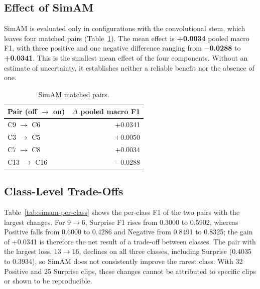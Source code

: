 \subsection{Effect of SimAM}
\label{sec:simam-effect-result}
\label{sec:simam-four-pairs}

SimAM is evaluated only in configurations with the convolutional stem, which leaves four matched pairs (Table~\ref{tab:simam-pairs-result}). The mean effect is \textbf{+0.0034} pooled macro F1, with three positive and one negative difference ranging from \textbf{$-$0.0288} to \textbf{+0.0341}. This is the smallest mean effect of the four components. Without an estimate of uncertainty, it establishes neither a reliable benefit nor the absence of one.

\begin{table}[htbp]
	\centering
	\begin{tabular}{l r}
		\hline
		\textbf{Pair (off $\rightarrow$ on)} & \textbf{$\Delta$ pooled macro F1} \\
		\hline
		C9 $\rightarrow$ C6   & +0.0341 \\
		C3 $\rightarrow$ C5   & +0.0050 \\
		C7 $\rightarrow$ C8   & +0.0034 \\
		C13 $\rightarrow$ C16 & $-$0.0288 \\
		\hline
	\end{tabular}
	\caption[SimAM matched pairs]{SimAM matched pairs.}
	\label{tab:simam-pairs-result}
\end{table}

\subsection{Class-Level Trade-Offs}
\label{sec:simam-mean-not-finding}
\label{sec:simam-supports}
\label{sec:simam-cost}

Table~\ref{tab:simam-per-class} shows the per-class F1 of the two pairs with the largest changes. For $9\rightarrow6$, Surprise F1 rises from 0.3000 to 0.5902, whereas Positive falls from 0.6000 to 0.4286 and Negative from 0.8491 to 0.8325; the gain of +0.0341 is therefore the net result of a trade-off between classes. The pair with the largest loss, $13\rightarrow16$, declines on all three classes, including Surprise (0.4035 to 0.3934), so SimAM does not consistently improve the rarest class. With 32 Positive and 25 Surprise clips, these changes cannot be attributed to specific clips or shown to be reproducible.

